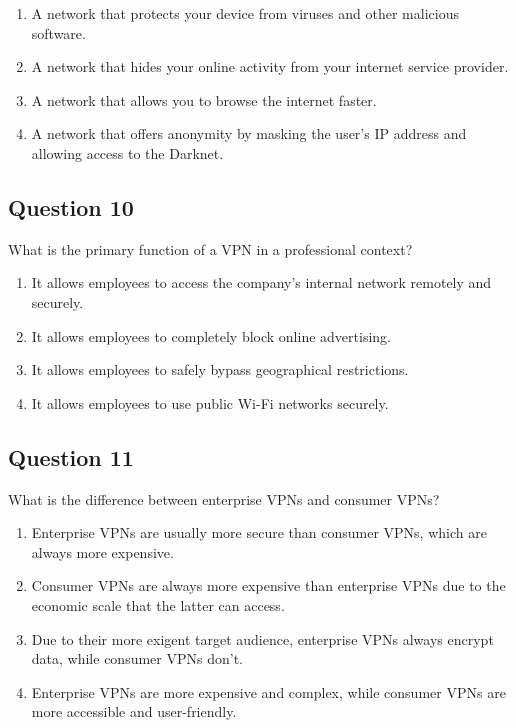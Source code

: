 \documentclass[12pt,a4paper]{article}
\begin{document}
\begin{enumerate}[label=\Alph*., leftmargin=*]
\item A network that protects your device from viruses and other malicious software.
\item A network that hides your online activity from your internet service provider.
\item A network that allows you to browse the internet faster.
\item A network that offers anonymity by masking the user's IP address and allowing access to the Darknet.
\end{enumerate}

\bigskip


\subsection*{Question 10}
What is the primary function of a VPN in a professional context?

\begin{enumerate}[label=\Alph*., leftmargin=*]
\item It allows employees to access the company's internal network remotely and securely.
\item It allows employees to completely block online advertising.
\item It allows employees to safely bypass geographical restrictions.
\item It allows employees to use public Wi-Fi networks securely.
\end{enumerate}

\bigskip


\subsection*{Question 11}
What is the difference between enterprise VPNs and consumer VPNs?

\begin{enumerate}[label=\Alph*., leftmargin=*]
\item Enterprise VPNs are usually more secure than consumer VPNs, which are always more expensive.
\item Consumer VPNs are always more expensive than enterprise VPNs due to the economic scale that the latter can access.
\item Due to their more exigent target audience, enterprise VPNs always encrypt data, while consumer VPNs don't.
\item Enterprise VPNs are more expensive and complex, while consumer VPNs are more accessible and user-friendly.
\end{enumerate}
\end{document}

